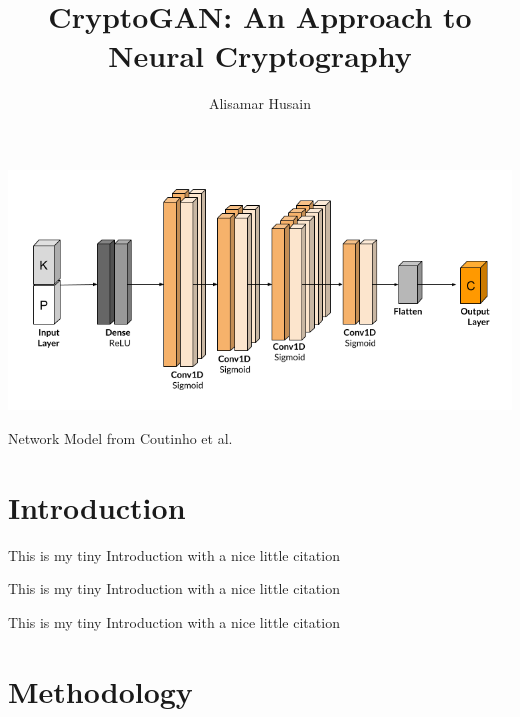 \documentclass[sigconf]{acmart}
\begin{document}
  \title{CryptoGAN: An Approach to Neural Cryptography}

  \author{Alisamar Husain}

  \begin{abstract}
    \lipsum[1]
  \end{abstract}
  
  \begin{teaserfigure}
    \includegraphics[width=\textwidth]{../ref/anclayers.png}
    \caption{Network Model from Coutinho et al.}
    \label{fig:teaser}
  \end{teaserfigure}

  \maketitle
 
  \section{Introduction}
  This is my tiny Introduction with a nice 
  little citation \cite{visualloss}

  This is my tiny Introduction with a nice 
  little citation \cite{seminalanc}
  
  
  This is my tiny Introduction with a nice 
  little citation \cite{perfanc}

  \section{Methodology} 
  \lipsum
  
  
  
\end{document}
